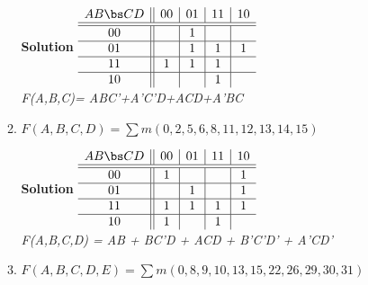 \begin{enumerate}
\begin{enumerate}
                \begin{onlysolution}  \textbf{Solution} \itshape{
                        $
                        \begin{array} {c||c|c|c|c}
                            A B \bs C D   & 00 & 01 & 11 & 10 \\ \hline \hline
                            00        &    & 1  &    &    \\ \hline
                            01        &    & 1  & 1  & 1  \\ \hline
                            11        & 1  & 1  & 1  &    \\ \hline
                            10        &    &    & 1  &    \\
                        \end{array}$  \\
                        F(A,B,C)= ABC'+A'C'D+ACD+A'BC
                    }
                \end{onlysolution}
            \item $F(A,B,C,D)=\sum m(0,2,5,6,8,11,12,13,14,15)$

                \begin{onlysolution}  \textbf{Solution} \itshape{
                        $
                        \begin{array} {c||c|c|c|c}
                            A B \bs C D   & 00 & 01 & 11 & 10 \\ \hline \hline
                            00        & 1  &    &    & 1  \\ \hline
                            01        &    & 1  &    & 1  \\ \hline
                            11        & 1  & 1  & 1  & 1  \\ \hline
                            10        & 1  &    & 1  &    \\
                        \end{array}$  \\
                        F(A,B,C,D) =  AB + BC'D + ACD + B'C'D' + A'CD'
                    }
                \end{onlysolution}
            \item $F(A,B,C,D,E)=\sum m(0,8,9,10,13,15,22,26,29,30,31)$


\end{enumerate}
\end{enumerate}
